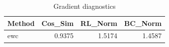 \begin{table}[htbp]
\centering
\caption{Gradient diagnostics}
\label{tab:grad-diag}
\begin{tabular}{lrrr}
\toprule
\textbf{Method} & \textbf{Cos\_Sim} & \textbf{RL\_Norm} & \textbf{BC\_Norm} \\
\midrule
ewc & 0.9375 & 1.5174 & 1.4587 \\
\bottomrule
\end{tabular}
\end{table}